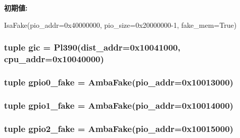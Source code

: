 \label{classRealView_1_1RealViewEB_a6dbb35031fbd3dbded6e05ca5db58c8e}
{\bfseries 初期値:}
\begin{DoxyCode}
IsaFake(pio_addr=0x40000000, pio_size=0x20000000-1,
                            fake_mem=True)
\end{DoxyCode}
\hypertarget{classRealView_1_1RealViewEB_a40243beb62d217c3a9e35801ae739fd0}{
\subsubsection[{gic}]{\setlength{\rightskip}{0pt plus 5cm}tuple {\bf gic} = {\bf Pl390}(dist\_\-addr=0x10041000, cpu\_\-addr=0x10040000)}}
\label{classRealView_1_1RealViewEB_a40243beb62d217c3a9e35801ae739fd0}
\hypertarget{classRealView_1_1RealViewEB_a290572125413a30d7e52e4bdeff0f6fd}{
\subsubsection[{gpio0\_\-fake}]{\setlength{\rightskip}{0pt plus 5cm}tuple {\bf gpio0\_\-fake} = {\bf AmbaFake}(pio\_\-addr=0x10013000)}}
\label{classRealView_1_1RealViewEB_a290572125413a30d7e52e4bdeff0f6fd}
\hypertarget{classRealView_1_1RealViewEB_aa30da97211a9426c3ce02c4e868d7203}{
\subsubsection[{gpio1\_\-fake}]{\setlength{\rightskip}{0pt plus 5cm}tuple {\bf gpio1\_\-fake} = {\bf AmbaFake}(pio\_\-addr=0x10014000)}}
\label{classRealView_1_1RealViewEB_aa30da97211a9426c3ce02c4e868d7203}
\hypertarget{classRealView_1_1RealViewEB_ad5e65e2358629c72cc90cf5dc3bdb8ab}{
\subsubsection[{gpio2\_\-fake}]{\setlength{\rightskip}{0pt plus 5cm}tuple {\bf gpio2\_\-fake} = {\bf AmbaFake}(pio\_\-addr=0x10015000)}}
